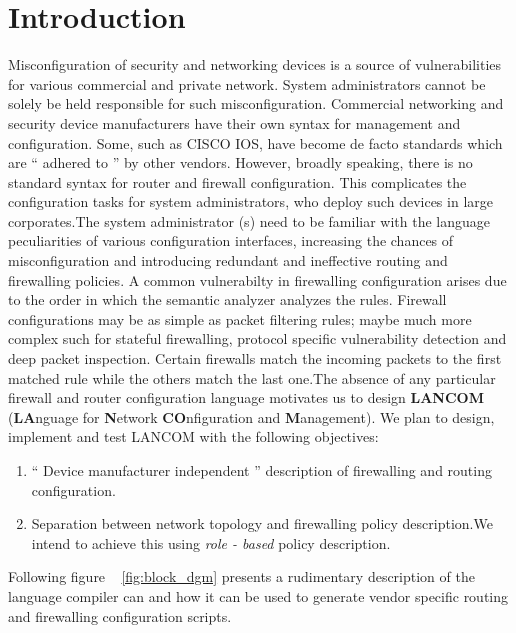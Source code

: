 \section{Introduction}
\label{sec:introduction}

Misconfiguration of security and networking devices is a source of
  vulnerabilities for various commercial and private network.
  System administrators cannot be solely be held responsible for such
  misconfiguration. Commercial networking and security device manufacturers have their own
  syntax for management and configuration. Some, such as CISCO IOS,
  have become de facto standards which are `` adhered to '' by other vendors.
  However, broadly speaking, there is no standard syntax for router and 
  firewall configuration.   This complicates the configuration tasks for system administrators,
  who deploy such devices in large corporates.The system administrator (s) need to be
  familiar with the language peculiarities of various   configuration interfaces, increasing 
  the chances of misconfiguration and introducing redundant and ineffective routing and firewalling
  policies. A common vulnerabilty in firewalling configuration arises due to the order in which the 
  semantic analyzer analyzes the rules. Firewall configurations may be as simple 
  as packet filtering rules; maybe much more complex such for stateful firewalling,
  protocol specific vulnerability detection and deep packet inspection.
  Certain firewalls match the incoming packets to the first matched rule
  while the others match the last one.The absence of any particular firewall and router configuration
  language motivates us to design {\bf LANCOM} ({\bf LA}nguage for {\bf N}etwork {\bf CO}nfiguration and
  {\bf M}anagement). We plan to design, implement and test LANCOM with the following objectives:

  \begin{enumerate}
    \item `` Device manufacturer independent '' description of firewalling and
             routing configuration. 
    \item  Separation between network topology and
           firewalling policy description.We intend to achieve this using 
           {\it role - based} policy description. 
  \end{enumerate}

Following figure ~ \ref {fig:block_dgm} presents a rudimentary description of 
the language compiler can and how it can be used to generate vendor specific 
 routing and firewalling configuration scripts. 

